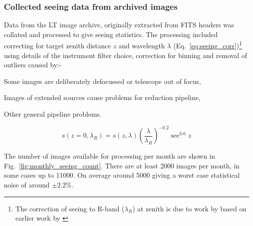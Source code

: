 {{%

\subsubsection{Collected seeing data from archived images}
\label{sect:collseedata}

Data from the LT image archive, originally extracted from FITS headers was collated and processed to give seeing statistics. The processing included correcting for target zenith distance $z$ and wavelength $\lambda$ (Eq.~\ref{eq:seeing_corr})\footnote{The correction of seeing to R-band ($\lambda_R$) at zenith is due to work by \citet {sarazin90eso} based on earlier work by \citet{fried66optical}} using details of the instrument filter choice, correction for binning and removal of outliers caused by:- \begin{inparaenum}
\item Some images are deliberately defocussed or telescope out of focus,
\item Images of extended sources cause problems for reduction pipeline,
\item Other general pipeline problems.
\end{inparaenum} 

\begin{equation}
  s(z=0,\lambda_R) = s(z,\lambda) (\frac{\lambda}{\lambda_R})^{-0.2}\sec^{0.6}z
\label{eq:seeing_corr}
\end{equation}

The number of images available for processing per month are shown in Fig.~\ref{fig:monthly_seeing_count}. There are at least 2000 images per month, in some cases up to 11000. On average around 5000 giving a worst case statistical noise of around $\pm 2.2$\%. 

}}
